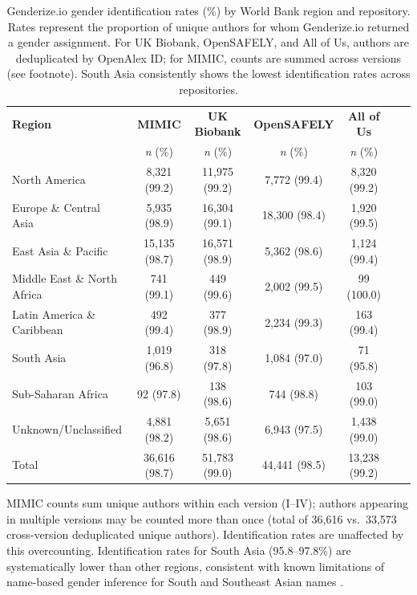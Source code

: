\documentclass[11pt]{article}
\begin{document}
\begin{table}[H]
\centering
\caption{Genderize.io gender identification rates (\%) by World Bank region and repository. Rates represent the proportion of unique authors for whom Genderize.io returned a gender assignment. For UK Biobank, OpenSAFELY, and All of Us, authors are deduplicated by OpenAlex ID; for MIMIC, counts are summed across versions (see footnote). South Asia consistently shows the lowest identification rates across repositories.}
\label{etab:genderize}
\small
\begin{tabular}{@{}lcccccc@{}}
\toprule
\textbf{Region} & \textbf{MIMIC} & \textbf{UK Biobank} & \textbf{OpenSAFELY} & \textbf{All of Us} \\
& \textit{n} (\%) & \textit{n} (\%) & \textit{n} (\%) & \textit{n} (\%) \\
\midrule
North America & 8,321 (99.2) & 11,975 (99.2) & 7,772 (99.4) & 8,320 (99.2) \\
Europe \& Central Asia & 5,935 (98.9) & 16,304 (99.1) & 18,300 (98.4) & 1,920 (99.5) \\
East Asia \& Pacific & 15,135 (98.7) & 16,571 (98.9) & 5,362 (98.6) & 1,124 (99.4) \\
Middle East \& North Africa & 741 (99.1) & 449 (99.6) & 2,002 (99.5) & 99 (100.0) \\
Latin America \& Caribbean & 492 (99.4) & 377 (98.9) & 2,234 (99.3) & 163 (99.4) \\
South Asia & 1,019 (96.8) & 318 (97.8) & 1,084 (97.0) & 71 (95.8) \\
Sub-Saharan Africa & 92 (97.8) & 138 (98.6) & 744 (98.8) & 103 (99.0) \\
Unknown/Unclassified & 4,881 (98.2) & 5,651 (98.6) & 6,943 (97.5) & 1,438 (99.0) \\
\midrule
Total & 36,616 (98.7) & 51,783 (99.0) & 44,441 (98.5) & 13,238 (99.2) \\
\bottomrule
\end{tabular}

\vspace{4pt}
{\footnotesize MIMIC counts sum unique authors within each version (I--IV); authors appearing in multiple versions may be counted more than once (total of 36,616 vs.\ 33,573 cross-version deduplicated unique authors). Identification rates are unaffected by this overcounting. Identification rates for South Asia (95.8--97.8\%) are systematically lower than other regions, consistent with known limitations of name-based gender inference for South and Southeast Asian names \cite{santamaria2018genderize}.}
\end{table}
\end{document}
